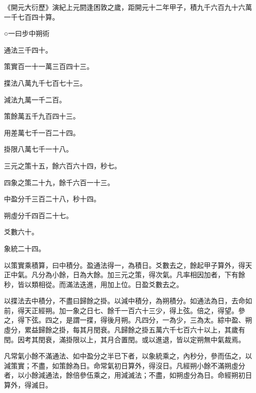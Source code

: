 
\begin{pinyinscope}

 《開元大衍歷》演紀上元閼逢困敦之歲，距開元十二年甲子，積九千六百九十六萬一千七百四十算。



 ○一曰步中朔術



 通法三千四十。



 策實百一十一萬三百四十三。



 揲法八萬九千七百七十三。



 減法九萬一千二百。



 策餘萬五千九百四十三。



 用差萬七千一百二十四。



 掛限八萬七千一十八。



 三元之策十五，餘六百六十四，秒七。



 四象之策二十九，餘千六百一十三。



 中盈分千三百二十八，秒十四。



 朔虛分千四百二十七。



 爻數六十。



 象統二十四。



 以策實乘積算，曰中積分。盈通法得一，為積日。爻數去之，餘起甲子算外，得天正中氣。凡分為小餘，日為大餘。加三元之策，得次氣。凡率相因加者，下有餘秒，皆以類相從。而滿法迭進，用加上位。日盈爻數去之。



 以揲法去中積分，不盡曰歸餘之掛。以減中積分，為朔積分。如通法為日，去命如前，得天正經朔。加一象之日七、餘千一百六十三少，得上弦。倍之，得望。參之，得下弦。四之，是謂一揲，得後月朔。凡四分，一為少，三為太。綜中盈、朔虛分，累益歸餘之掛，每其月閏衰。凡歸餘之掛五萬六千七百六十以上，其歲有閏。因考其閏衰，滿掛限以上，其月合置閏。或以進退，皆以定朔無中氣裁焉。



 凡常氣小餘不滿通法、如中盈分之半已下者，以象統乘之，內秒分，參而伍之，以減策實；不盡，如策餘為日。命常氣初日算外，得沒日。凡經朔小餘不滿朔虛分者，以小餘減通法，餘倍參伍乘之，用減滅法；不盡，如朔虛分為日。命經朔初日算外，得滅日。




\end{pinyinscope}
